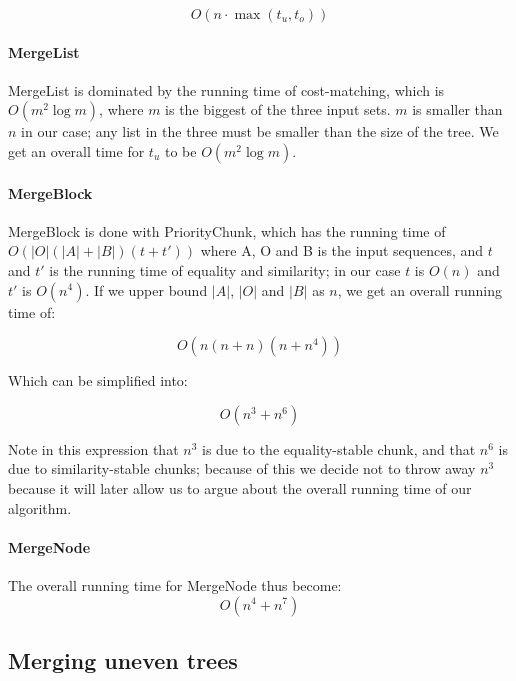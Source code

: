 \documentclass[11pt]{article}
\begin{document}
\begin{equation}
O(n \cdot \max(t_u, t_o)) \nonumber
\end{equation}

\paragraph{MergeList} MergeList is dominated by the running time of cost-matching, which is $O(m^2 \log m)$, where $m$ is the biggest of the three input sets. $m$ is smaller than $n$ in our case; any list in the three must be smaller than the size of the tree. We get an overall time for $t_u$ to be $O(m^2 \log m)$.

\paragraph{MergeBlock} MergeBlock is done with PriorityChunk, which has the running time of $O(|O| (|A| + |B|)(t + t'))$ where A, O and B is the input sequences, and $t$ and $t'$ is the running time of equality and similarity; in our case $t$ is $O(n)$ and $t'$ is $O(n^4)$. If we upper bound $|A|$, $|O|$ and $|B|$ as $n$, we get an overall running time of:

\begin{equation}
O(n (n + n)(n + n^4)) \nonumber
\end{equation}

Which can be simplified into:

\begin{equation}
O(n^3 + n^6) \nonumber
\end{equation}

Note in this expression that $n^3$ is due to the equality-stable chunk, and that $n^6$ is due to similarity-stable chunks; because of this we decide not to throw away $n^3$ because it will later allow us to argue about the overall running time of our algorithm.

\paragraph{MergeNode} The overall running time for MergeNode thus become:
\begin{equation}
O(n^4 + n^7) \nonumber
\end{equation}

\subsection{Merging uneven trees}
\end{document}
